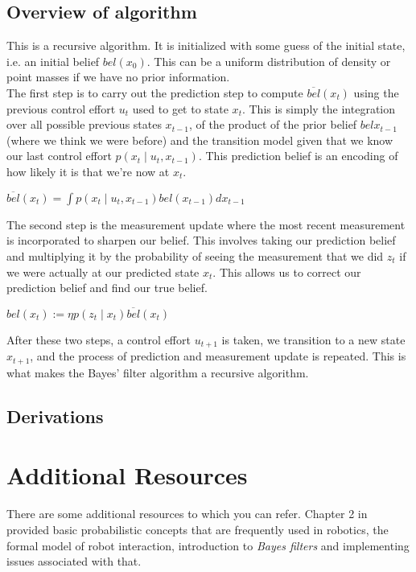 \documentclass[twoside]{article}
\begin{document}
\subsection{Overview of algorithm}
This is a recursive algorithm. It is initialized with some guess of the initial state, i.e. an initial belief $bel(x_0)$. This can be a uniform distribution of density or point masses if we have no prior information. \\
The first step is to carry out the prediction step to compute $\overline{bel}(x_t)$ using the previous control effort $u_t$ used to get to state $x_t$. This is simply the integration over all possible previous states $x_{t-1}$, of the product of the prior belief $bel{x_{t-1}}$ (where we think we were before) and the transition model given that we know our last control effort $p(x_t \mid u_t, x_{t-1})$. This prediction belief is an encoding of how likely it is that we're now at $x_t$.
\begin{center}
$\overline{bel}(x_t)= \int p(x_t \mid u_t, x_{t-1}) bel({x_{t-1}}) dx_{t-1}$
\end{center}
The second step is the measurement update where the most recent measurement is incorporated to sharpen our belief. This involves taking our prediction belief and multiplying it by the probability of seeing the measurement that we did $z_t$ if we were actually at our predicted state $x_t$. This allows us to correct our prediction belief and find our true belief. 
\begin{center}
$bel(x_t):=\eta p(z_t\mid x_t) \overline{bel}(x_t) $
\end{center} 
After these two steps, a control effort $u_{t+1}$ is taken, we transition to a new state $x_{t+1}$, and the process of prediction and measurement update is repeated. This is what makes the Bayes' filter algorithm a recursive algorithm. 

\subsection{Derivations}

\section{Additional Resources}

There are some additional resources to which you can refer. Chapter 2 in \cite{thrun2005probabilistic} provided basic probabilistic concepts that are frequently used in robotics, the formal model of robot interaction, introduction to \textit{Bayes filters} and implementing issues associated with that. 
\end{document}
